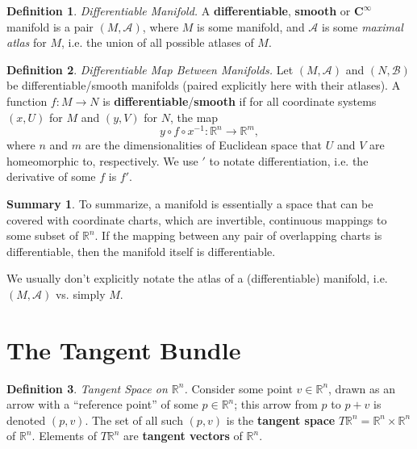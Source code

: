 \documentclass[10pt,landscape]{article}
\theoremstyle{definition}
\newtheorem{definition}{Definition}[section]
\theoremstyle{theorem}
\theoremstyle{summary}
\newtheorem*{summary}{Summary}
\theoremstyle{remark}
\newcommand{\R}{\mathbb{R}}
\newcommand{\Rn}{\mathbb{R}^n}
\begin{document}
\begin{multicols*}{3}
\theoremstyle{definition}
\begin{definition}{\textit{Differentiable Manifold.}}
A \textbf{differentiable}, \textbf{smooth} or $\bm{C^\infty}$ manifold is a pair $(M, \mathcal{A})$, where $M$ is some manifold, and $\mathcal{A}$ is some \textit{maximal atlas} for $M$, i.e. the union of all possible atlases of $M$. 
\end{definition}

\theoremstyle{definition}
\begin{definition}{\textit{Differentiable Map Between Manifolds.}}
Let $(M, \mathcal{A})$ and $(N,\mathcal{B})$ be differentiable/smooth manifolds (paired explicitly here with their atlases). A function $f:M\rightarrow N$ is \textbf{differentiable}/\textbf{smooth} if for all coordinate systems $(x,U)$ for $M$ and $(y,V)$ for $N$, the map
\begin{equation}
    y\circ f\circ x^{-1} : \Rn \rightarrow \R^m,
\end{equation}
where $n$ and $m$ are the dimensionalities of Euclidean space that $U$ and $V$ are homeomorphic to, respectively. We use $'$ to notate differentiation, i.e. the derivative of some $f$ is $f'$.
\end{definition}

\begin{summary}
To summarize, a manifold is essentially a space that can be covered with coordinate charts, which are invertible, continuous mappings to some subset of $\Rn$. If the mapping between any pair of overlapping charts is differentiable, then the manifold itself is differentiable. 

We usually don't explicitly notate the atlas of a (differentiable) manifold, i.e. $(M, \mathcal{A})$ vs. simply $M$.
\end{summary}

\section{The Tangent Bundle}

\theoremstyle{definition}
\begin{definition}{\textit{Tangent Space on $\Rn$.}}
Consider some point $v\in\Rn$, drawn as an arrow with a ``reference point'' of some $p\in\Rn$; this arrow from $p$ to $p+v$ is denoted $(p,v)$. The set of all such $(p,v)$ is the \textbf{tangent space} $T\Rn = \Rn\times\Rn$ of $\Rn$. Elements of $T\Rn$ are \textbf{tangent vectors} of $\Rn$.
\end{definition}


\end{multicols*}
\end{document}
